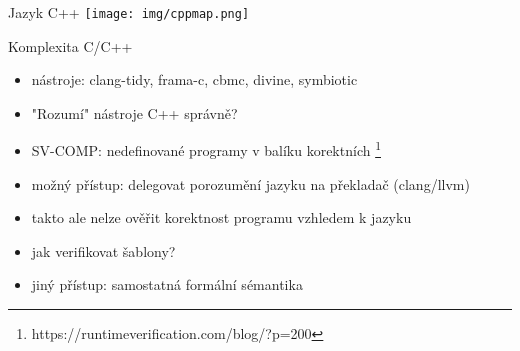 \documentclass[11pt]{beamer}
\begin{document}
\begin{frame}{Jazyk C++}
\texttt{[image: img/cppmap.png]}
\end{frame}

%
%



\begin{frame}{Komplexita C/C++}
\begin{itemize}
\item nástroje: clang-tidy, frama-c, cbmc, divine, symbiotic
\item "Rozumí" nástroje C++ správně?
\item SV-COMP: nedefinované programy v balíku korektních \footnote[frame]{https://runtimeverification.com/blog/?p=200}
\pause \item možný přístup: delegovat porozumění jazyku na překladač (clang/llvm)
\pause \item takto ale nelze ověřit korektnost programu vzhledem k jazyku
\pause \item jak verifikovat šablony?
\pause \item jiný přístup: samostatná formální sémantika
\end{itemize}
\end{frame}
\end{document}
